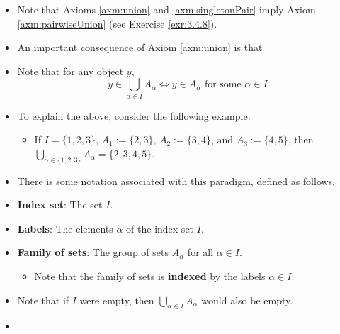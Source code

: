 \documentclass[../main.tex]{subfiles}
\begin{document}
\begin{itemize}
\begin{axm}[Union]
    \end{axm}
    \item Note that Axioms \ref{axm:union} and \ref{axm:singletonPair} imply Axiom \ref{axm:pairwiseUnion} (see Exercise \ref{exr:3.4.8}).
    \item An important consequence of Axiom \ref{axm:union} is that 
    \item Note that for any object $y$,
    \begin{equation}\label{eqn:unionElements}
        y\in\bigcup_{\alpha\in I}A_\alpha \Longleftrightarrow y\in A_\alpha\text{ for some }\alpha\in I
    \end{equation}
    \item To explain the above, consider the following example.
    \begin{itemize}
        \item If $I=\{1,2,3\}$, $A_1:=\{2,3\}$, $A_2:=\{3,4\}$, and $A_3:=\{4,5\}$, then $\bigcup_{\alpha\in\{1,2,3\}}A_\alpha=\{2,3,4,5\}$.
    \end{itemize}
    \item There is some notation associated with this paradigm, defined as follows.
    \item \textbf{Index set}: The set $I$.
    \item \textbf{Labels}: The elements $\alpha$ of the index set $I$.
    \item \textbf{Family of sets}: The group of sets $A_\alpha$ for all $\alpha\in I$.
    \begin{itemize}
        \item Note that the family of sets is \textbf{indexed} by the labels $\alpha\in I$.
    \end{itemize}
    \item Note that if $I$ were empty, then $\bigcup_{\alpha\in I}A_\alpha$ would also be empty.
    \item {}
\end{itemize}
\end{document}
